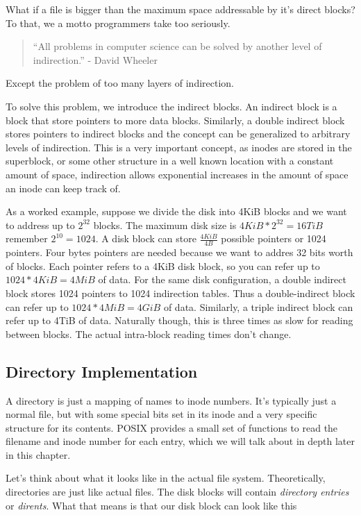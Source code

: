What if a file is bigger than the maximum space addressable by it's direct blocks?
To that, we a motto programmers take too seriously.

\begin{quote}
``All problems in computer science can be solved by another level of indirection.'' - David Wheeler
\end{quote}

Except the problem of too many layers of indirection.

To solve this problem, we introduce the indirect blocks.
An indirect block is a block that store pointers to more data blocks.
Similarly, a double indirect block stores pointers to indirect blocks and the concept can be generalized to arbitrary levels of indirection.
This is a very important concept, as inodes are stored in the superblock, or some other structure in a well known location with a constant amount of space, indirection allows exponential increases in the amount of space an inode can keep track of.

As a worked example, suppose we divide the disk into 4KiB blocks and we want to address up to $2^{32}$ blocks.
The maximum disk size is $4KiB *2^{32} = 16TiB$ remember $2^{10} = 1024$.
A disk block can store $\frac{4KiB}{4B}$ possible pointers or  1024 pointers.
Four bytes pointers are needed because we want to addres 32 bits worth of blocks.
Each pointer refers to a 4KiB disk block, so you can refer up to $1024*4KiB = 4MiB$ of data.
For the same disk configuration, a double indirect block stores 1024 pointers to 1024 indirection tables.
Thus a double-indirect block can refer up to $1024 * 4MiB = 4GiB$ of data.
Similarly, a triple indirect block can refer up to 4TiB of data.
Naturally though, this is three times as slow for reading between blocks.
The actual intra-block reading times don't change.

\subsection{Directory Implementation}

A directory is just a mapping of names to inode numbers.
It's typically just a normal file, but with some special bits set in its inode and a very specific structure for its contents.
POSIX provides a small set of functions to read the filename and inode number for each entry, which we will talk about in depth later in this chapter.

Let's think about what it looks like in the actual file system.
Theoretically, directories are just like actual files.
The disk blocks will contain \emph{directory entries} or \emph{dirents}.
What that means is that our disk block can look like this

